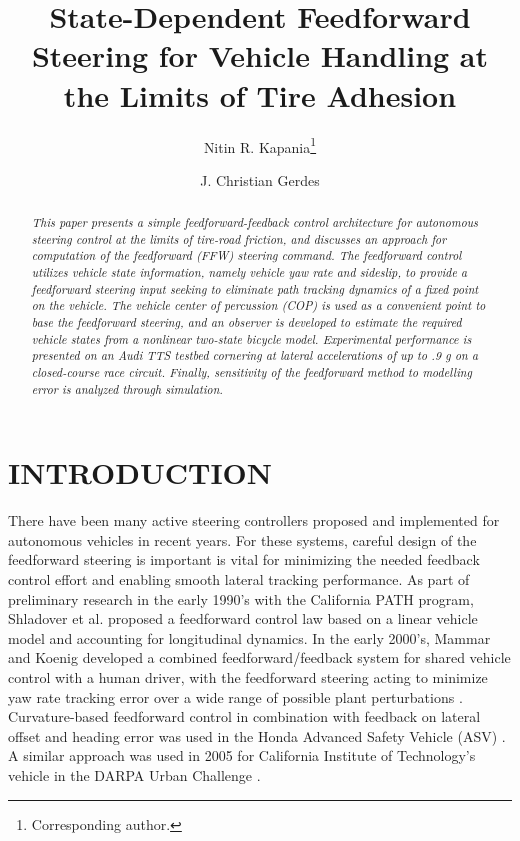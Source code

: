 \documentclass[twocolumn,10pt]{asme2e}
\title{State-Dependent Feedforward Steering for Vehicle Handling at the Limits of Tire Adhesion}
\author{Nitin R. Kapania\thanks{Corresponding author.}
    \affiliation{
    Dynamic Design Lab\\
    Dept. of Mechanical Engineering\\
    Stanford University\\
    Stanford, California 94305\\
    email: nkapania@stanford.edu
    }	
}
\author{J. Christian Gerdes
    \affiliation{
    Dynamic Design Lab\\
    Dept. of Mechanical Engineering\\
    Stanford University\\
    Stanford, California 94305\\
    email: gerdes@stanford.edu
    }
}
\begin{document}
\maketitle

\begin{abstract} 
\it{This paper presents a simple feedforward-feedback control architecture for autonomous steering control at the limits of tire-road friction, 
and discusses an approach for computation of the feedforward (FFW) steering command. The feedforward control utilizes vehicle state information, namely vehicle yaw rate and sideslip, to provide a feedforward steering input seeking to eliminate path tracking dynamics of a fixed point on the vehicle. The vehicle center of percussion (COP) is used as a convenient point to 
base the feedforward steering, and an observer is developed to estimate the required vehicle states from a nonlinear two-state bicycle model. Experimental performance is presented on an Audi TTS testbed cornering at lateral accelerations of up to .9 g on a closed-course race circuit. Finally, sensitivity of the feedforward method to modelling error is analyzed through simulation.}
\end{abstract}


\section{INTRODUCTION}

There have been many active steering controllers proposed and implemented for autonomous vehicles in recent years. For these systems, careful design of the feedforward steering is important is vital for minimizing the needed feedback control effort and enabling smooth lateral tracking performance. As part of preliminary research in the early 1990's with the California PATH program, Shladover et al. \cite{shladover} proposed
a feedforward control law based on a linear vehicle model and accounting for longitudinal dynamics.  In the early 2000's,  Mammar and Koenig  developed a combined feedforward/feedback system for shared vehicle control with a human driver, with the feedforward steering acting to minimize yaw rate tracking error over a wide range of possible plant perturbations \cite{mammar}. Curvature-based feedforward control in combination with feedback on lateral offset and heading error
was used in the Honda Advanced Safety Vehicle (ASV) \cite{takahashi}. A similar approach was used in 2005 for California Institute of Technology's vehicle in the DARPA Urban Challenge \cite{cremean}. 
\end{document}

